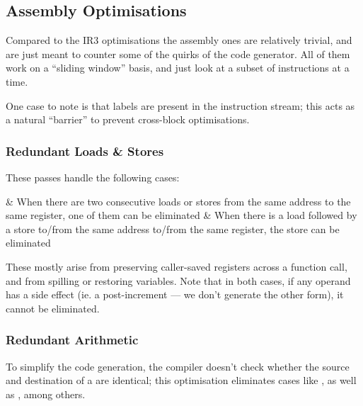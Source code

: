\documentclass[12pt]{article}
\begin{document}


\subsection{Assembly Optimisations}

Compared to the IR3 optimisations the assembly ones are relatively trivial, and are just meant to counter some of the quirks
of the code generator. All of them work on a \enquote{sliding window} basis, and just look at a subset of instructions at a time.

One case to note is that labels are present in the instruction stream; this acts as a natural \enquote{barrier} to prevent
cross-block optimisations.


\subsubsection{Redundant Loads \& Stores}

These passes handle the following cases:

\begin{romanlist2}
&   When there are two consecutive loads or stores from the same address to the same register, one of them can be eliminated
&   When there is a load followed by a store to/from the same address to/from the same register, the store can be eliminated
\end{romanlist2}

These mostly arise from preserving caller-saved registers across a function call, and from spilling or restoring variables.
Note that in both cases, if any operand has a side effect (ie. a post-increment \eqtt{!} --- we don't generate the other form),
it cannot be eliminated.



\subsubsection{Redundant Arithmetic}

To simplify the code generation, the compiler doesn't check whether the source and destination of a  are identical;
this optimisation eliminates cases like , as well as , among others.

\end{document}

